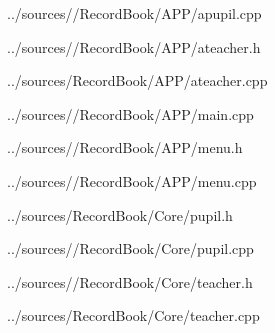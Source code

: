 \documentclass[12pt,a4paper]{report}
\begin{document}

{../sources//RecordBook/APP/apupil.cpp}


{../sources//RecordBook/APP/ateacher.h}


{../sources/RecordBook/APP/ateacher.cpp}


{../sources//RecordBook/APP/main.cpp}

{../sources//RecordBook/APP/menu.h}

{../sources//RecordBook/APP/menu.cpp}

{../sources/RecordBook/Core/pupil.h}


{../sources//RecordBook/Core/pupil.cpp}


{../sources//RecordBook/Core/teacher.h}


{../sources/RecordBook/Core/teacher.cpp}
\end{document}
